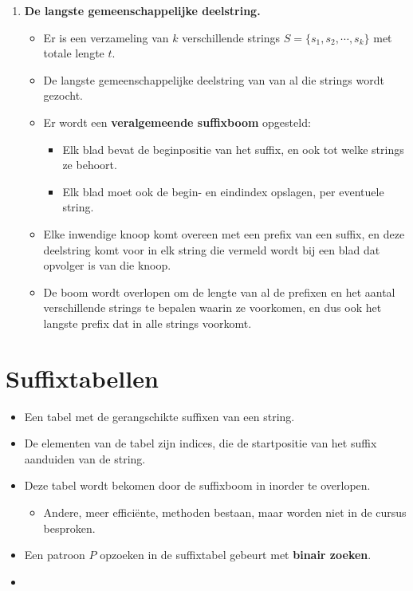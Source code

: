 \begin{itemize}
\begin{enumerate}
        \item \textbf{De langste gemeenschappelijke deelstring.}
        \begin{itemize}
            \item Er is een verzameling van $k$ verschillende strings $S = \{s_1, s_2, \cdots, s_k\}$ met totale lengte $t$.
            \item De langste gemeenschappelijke deelstring van van al die strings wordt gezocht.
            \item Er wordt een \textbf{veralgemeende suffixboom} opgesteld:
            \begin{itemize}
                \item Elk blad bevat de beginpositie van het suffix, en ook tot welke strings ze behoort.
                \item Elk blad moet ook de begin- en eindindex opslagen, per eventuele string.
            \end{itemize}
            \item Elke inwendige knoop komt overeen met een prefix van een suffix, en deze deelstring komt voor in elk string die vermeld wordt bij een blad dat opvolger is van die knoop.
            \item De boom wordt overlopen om de lengte van al de prefixen en het aantal verschillende strings te bepalen waarin ze voorkomen, en dus ook het langste prefix dat in alle strings voorkomt.
        \end{itemize}
        
    \end{enumerate}
\end{itemize}

\section{Suffixtabellen}
\begin{itemize}
    \item Een tabel met de gerangschikte suffixen van een string.
    \item De elementen van de tabel zijn indices, die de startpositie van het suffix aanduiden van de string.
    \item Deze tabel wordt bekomen door de suffixboom in inorder te overlopen. 
    \begin{itemize}
        \item Andere, meer efficiënte, methoden bestaan, maar worden niet in de cursus besproken.
    \end{itemize}

    \item Een patroon $P$ opzoeken in de suffixtabel gebeurt met \textbf{binair zoeken}.
    \item  
\end{itemize}

